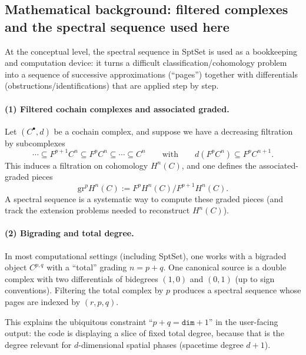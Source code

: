 \documentclass{SciPost}
\begin{document}
\subsection{Mathematical background: filtered complexes and the spectral sequence used here}

At the conceptual level, the spectral sequence in SptSet is used as a bookkeeping and computation device: it turns a difficult classification/cohomology problem into a sequence of successive approximations (``pages'') together with differentials (obstructions/identifications) that are applied step by step.

\paragraph{(1) Filtered cochain complexes and associated graded.}
Let $(C^{\bullet},d)$ be a cochain complex, and suppose we have a decreasing filtration by subcomplexes
\begin{equation}
\cdots \subseteq F^{p+1}C^{n} \subseteq F^{p}C^{n} \subseteq \cdots \subseteq C^{n}
\qquad\text{with}\qquad d(F^{p}C^{n})\subseteq F^{p}C^{n+1}.
\end{equation}
This induces a filtration on cohomology $H^{n}(C)$, and one defines the associated-graded pieces
\begin{equation}
\mathrm{gr}^{p}H^{n}(C) := F^{p}H^{n}(C)\big/ F^{p+1}H^{n}(C).
\end{equation}
A spectral sequence is a systematic way to compute these graded pieces (and track the extension problems needed to reconstruct $H^{n}(C)$).

\paragraph{(2) Bigrading and total degree.}
In most computational settings (including SptSet), one works with a bigraded object $C^{p,q}$ with a ``total'' grading $n=p+q$.
One canonical source is a double complex with two differentials of bidegrees $(1,0)$ and $(0,1)$ (up to sign conventions).
Filtering the total complex by $p$ produces a spectral sequence whose pages are indexed by $(r,p,q)$.

This explains the ubiquitous constraint ``$p+q=\texttt{dim}+1$'' in the user-facing output: the code is displaying a slice of fixed total degree, because that is the degree relevant for $d$-dimensional spatial phases (spacetime degree $d+1$).
\end{document}

